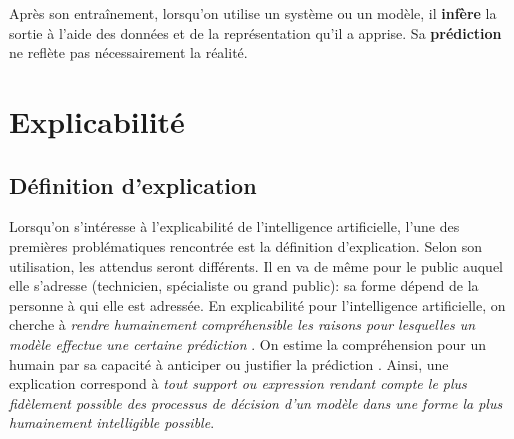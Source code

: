 \documentclass{report}
\begin{document}
     Après son entraînement, lorsqu'on utilise un système ou un modèle, il \textbf{infère} la sortie à l'aide des données et de la représentation qu'il a apprise. Sa \textbf{prédiction} ne reflète pas nécessairement la réalité. 



\section{Explicabilité}
    \subsection{Définition d'explication}
    \label{ssec:def_expl}
        
        Lorsqu'on s'intéresse à l'explicabilité de l'intelligence artificielle, l'une des premières problémati\-ques rencontrée est la définition d'explication. Selon son utilisation, les attendus seront différents. Il en va de même pour le public auquel elle s'adresse (technicien, spécialiste ou grand public): sa forme dépend de la personne à qui elle est adressée.
        En explicabilité pour l'intelligence artificielle, on cherche à \emph{rendre humainement compréhensible les raisons pour lesquelles un modèle effectue une certaine prédiction} \cite{garouani_investigating_2024, bell_its_2022}. On estime la compréhension pour un humain par sa capacité à anticiper ou justifier la prédiction \cite{bell_its_2022}. Ainsi, une explication correspond à \emph{tout support ou expression rendant compte le plus fidèlement possible des processus de décision d'un modèle dans une forme la plus humainement intelligible possible}.
        
\end{document}
